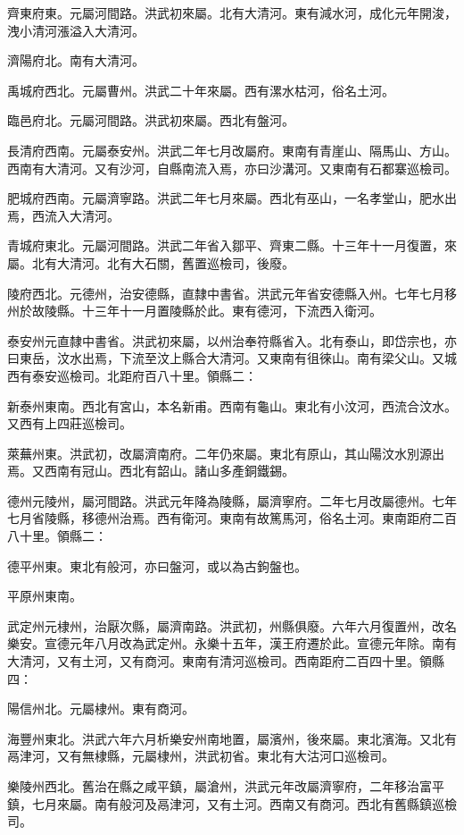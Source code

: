 齊東府東。元屬河間路。洪武初來屬。北有大清河。東有減水河，成化元年開浚，洩小清河漲溢入大清河。

濟陽府北。南有大清河。

禹城府西北。元屬曹州。洪武二十年來屬。西有漯水枯河，俗名土河。

臨邑府北。元屬河間路。洪武初來屬。西北有盤河。

長清府西南。元屬泰安州。洪武二年七月改屬府。東南有青崖山、隔馬山、方山。西南有大清河。又有沙河，自縣南流入焉，亦曰沙溝河。又東南有石都寨巡檢司。

肥城府西南。元屬濟寧路。洪武二年七月來屬。西北有巫山，一名孝堂山，肥水出焉，西流入大清河。

青城府東北。元屬河間路。洪武二年省入鄒平、齊東二縣。十三年十一月復置，來屬。北有大清河。北有大石關，舊置巡檢司，後廢。

陵府西北。元德州，治安德縣，直隸中書省。洪武元年省安德縣入州。七年七月移州於故陵縣。十三年十一月置陵縣於此。東有德河，下流西入衛河。

泰安州元直隸中書省。洪武初來屬，以州治奉符縣省入。北有泰山，即岱宗也，亦曰東岳，汶水出焉，下流至汶上縣合大清河。又東南有徂徠山。南有梁父山。又城西有泰安巡檢司。北距府百八十里。領縣二：

新泰州東南。西北有宮山，本名新甫。西南有龜山。東北有小汶河，西流合汶水。又西有上四莊巡檢司。

萊蕪州東。洪武初，改屬濟南府。二年仍來屬。東北有原山，其山陽汶水別源出焉。又西南有冠山。西北有韶山。諸山多產銅鐵錫。

德州元陵州，屬河間路。洪武元年降為陵縣，屬濟寧府。二年七月改屬德州。七年七月省陵縣，移德州治焉。西有衛河。東南有故篤馬河，俗名土河。東南距府二百八十里。領縣二：

德平州東。東北有般河，亦曰盤河，或以為古鉤盤也。

平原州東南。

武定州元棣州，治厭次縣，屬濟南路。洪武初，州縣俱廢。六年六月復置州，改名樂安。宣德元年八月改為武定州。永樂十五年，漢王府遷於此。宣德元年除。南有大清河，又有土河，又有商河。東南有清河巡檢司。西南距府二百四十里。領縣四：

陽信州北。元屬棣州。東有商河。

海豐州東北。洪武六年六月析樂安州南地置，屬濱州，後來屬。東北濱海。又北有鬲津河，又有無棣縣，元屬棣州，洪武初省。東北有大沽河口巡檢司。

樂陵州西北。舊治在縣之咸平鎮，屬滄州，洪武元年改屬濟寧府，二年移治富平鎮，七月來屬。南有般河及鬲津河，又有土河。西南又有商河。西北有舊縣鎮巡檢司。


